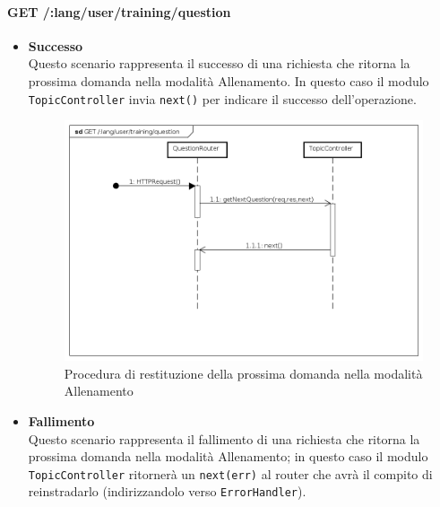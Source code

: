 \paragraph{GET /:lang/user/training/question} %
\begin{itemize}
\item \textbf{Successo}\\
Questo scenario rappresenta il successo di una richiesta che ritorna la prossima domanda nella modalità Allenamento. In questo caso il modulo \texttt{TopicController} invia \texttt{next()} per indicare il successo dell'operazione.

\begin{figure}[ht]
	\centering
	\includegraphics[scale=0.45]{UML/DiagrammiDiSequenza/Back-end/GET__lang_user_training_question_success.png}
	\caption{Procedura di restituzione della prossima domanda nella modalità Allenamento}
\end{figure}
\FloatBarrier

\item \textbf{Fallimento}\\
Questo scenario rappresenta il fallimento di una richiesta che ritorna la prossima domanda nella modalità Allenamento; in questo caso il modulo \texttt{TopicController} ritornerà un \texttt{next(err)} al router che avrà il compito di reinstradarlo (indirizzandolo verso \texttt{ErrorHandler}).


\end{itemize}

